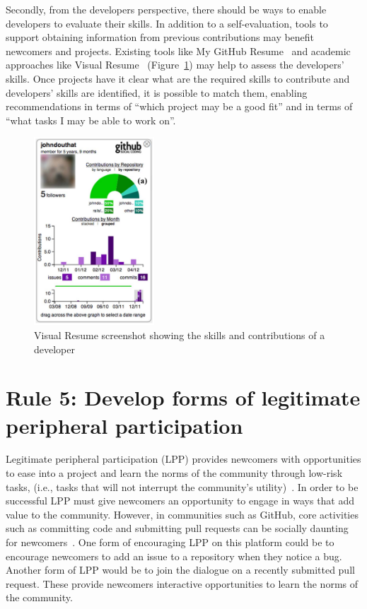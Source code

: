 \documentclass[10pt,letterpaper]{article}
\newcommand{\rulemajor}[1]{\section*{#1}}
\begin{document}
Secondly,
from the developers perspective,
there should be ways to enable developers to evaluate their skills.
In addition to a self-evaluation,
tools to support obtaining information from previous contributions may benefit newcomers and projects.
Existing tools like My GitHub Resume~\cite{my-github-resume}
and academic approaches like Visual Resume~\cite{sarma2016} (Figure~\ref{fig:visualResume})
may help to assess the developers' skills.
Once projects have it clear what are the required skills to contribute and developers' skills are identified,
it is possible to match them,
enabling recommendations in terms of ``which project may be a good fit''
and in terms of ``what tasks I may be able to work on''.

\begin{figure}[hbt]
  \centering
  \includegraphics[width=4.5cm]{contributions.png}
  \caption{Visual Resume screenshot showing the skills and contributions of a developer}
  \label{fig:visualResume}
\end{figure}

\rulemajor{Rule 5: Develop forms of legitimate peripheral participation}

Legitimate peripheral participation (LPP) provides newcomers with opportunities to ease into a project
and learn the norms of the community through low-risk tasks,
(i.e., tasks that will not interrupt the community's utility)~\cite{lave1991,wenger1999}.
In order to be successful LPP must give newcomers an opportunity to engage in ways that add value to the community.
However,
in communities such as GitHub,
core activities such as committing code and submitting pull requests can be socially daunting for newcomers~\cite{steinmacher2015}.
One form of encouraging LPP on this platform could be to encourage newcomers to add an issue to a repository when they notice a bug.
Another form of LPP would be to join the dialogue on a recently submitted pull request.
These provide newcomers interactive opportunities to learn the norms of the community. 
\end{document}
